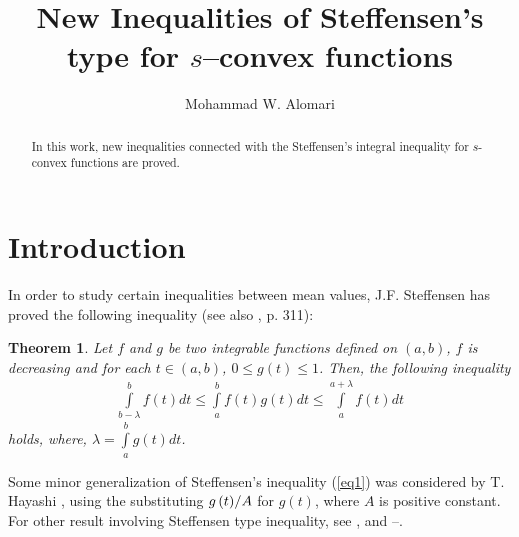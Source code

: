 \documentclass{amsart}
\newtheorem{theorem}{Theorem}
\theoremstyle{plain}
\numberwithin{equation}{section}
\begin{document}
\title[New Inequalities of Steffensen's type]{New Inequalities of Steffensen's type for $s$--convex functions}

\author[M.W. Alomari]{Mohammad W. Alomari}
\address{Department of Mathematics,
Faculty of Science, Jerash University, 26150 Jerash, Jordan}




\begin{abstract}
In this work, new inequalities connected with the Steffensen's
integral inequality for $s$-convex functions are proved.
\end{abstract}





\maketitle

\section{Introduction}
In order to study certain inequalities between mean values, J.F.
Steffensen \cite{RefK} has proved the following inequality (see
also \cite{RefI}, p. 311):
\begin{theorem}
Let $f$ and $g$ be two integrable functions defined on $(a,b)$,
$f$ is decreasing and for each $t \in (a,b)$, $0 \le g(t) \le 1$.
Then, the following inequality
\begin{eqnarray}
\label{eq1}\int\limits_{b - \lambda }^b {f\left( t \right)dt}  \le
\int\limits_a^b {f\left( t \right)g\left( t \right)dt} \le
\int\limits_a^{a + \lambda } {f\left( t \right)dt}
\end{eqnarray}
holds, where, $\lambda  = \int\limits_a^b {g\left( t \right)dt}$.
\end{theorem}

Some minor generalization of Steffensen's inequality (\ref{eq1})
was considered by T. Hayashi \cite{RefE}, using the substituting $
{{g\left( t \right)} \mathord{\left/
 {\vphantom {{g\left( t \right)} A}} \right.
 \kern-\nulldelimiterspace} A}$ for $g\left( t \right)$, where $A$ is positive constant.
For other result involving Steffensen type inequality, see
\cite{RefC}, \cite{RefE} and \cite{RefH}--\cite{RefK}.\\
\end{document}
